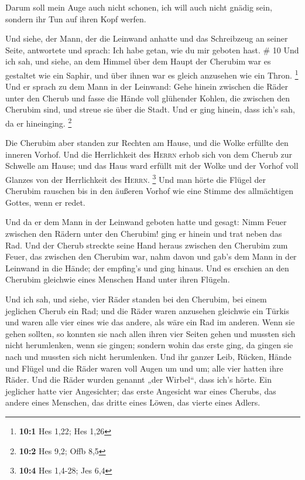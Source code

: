 Darum soll mein Auge auch nicht schonen, ich will auch
nicht gnädig sein, sondern ihr Tun auf ihren Kopf werfen.

 Und siehe, der Mann, der die Leinwand anhatte und das
Schreibzeug an seiner Seite, antwortete und sprach: Ich habe getan, wie
du mir geboten hast. \# 10  Und ich sah, und siehe, an dem
Himmel über dem Haupt der Cherubim war es gestaltet wie ein Saphir, und
über ihnen war es gleich anzusehen wie ein Thron. \footnote{\textbf{10:1}
  Hes 1,22; Hes 1,26}  Und er sprach zu dem Mann in der
Leinwand: Gehe hinein zwischen die Räder unter den Cherub und fasse die
Hände voll glühender Kohlen, die zwischen den Cherubim sind, und streue
sie über die Stadt. Und er ging hinein, dass ich's sah, da er
hineinging. \footnote{\textbf{10:2} Hes 9,2; Offb 8,5}

 Die Cherubim aber standen zur Rechten am Hause, und die
Wolke erfüllte den inneren Vorhof.  Und die Herrlichkeit
des \textsc{Herrn} erhob sich von dem Cherub zur Schwelle am Hause; und
das Haus ward erfüllt mit der Wolke und der Vorhof voll Glanzes von der
Herrlichkeit des \textsc{Herrn}. \footnote{\textbf{10:4} Hes 1,4-28; Jes
  6,4}  Und man hörte die Flügel der Cherubim rauschen bis
in den äußeren Vorhof wie eine Stimme des allmächtigen Gottes, wenn er
redet.

 Und da er dem Mann in der Leinwand geboten hatte und
gesagt: Nimm Feuer zwischen den Rädern unter den Cherubim! ging er
hinein und trat neben das Rad.  Und der Cherub streckte
seine Hand heraus zwischen den Cherubim zum Feuer, das zwischen den
Cherubim war, nahm davon und gab's dem Mann in der Leinwand in die
Hände; der empfing's und ging hinaus.  Und es erschien an
den Cherubim gleichwie eines Menschen Hand unter ihren Flügeln.

 Und ich sah, und siehe, vier Räder standen bei den
Cherubim, bei einem jeglichen Cherub ein Rad; und die Räder waren
anzusehen gleichwie ein Türkis  und waren alle vier eines
wie das andere, als wäre ein Rad im anderen.  Wenn sie
gehen sollten, so konnten sie nach allen ihren vier Seiten gehen und
mussten sich nicht herumlenken, wenn sie gingen; sondern wohin das erste
ging, da gingen sie nach und mussten sich nicht herumlenken.
 Und ihr ganzer Leib, Rücken, Hände und Flügel und die
Räder waren voll Augen um und um; alle vier hatten ihre Räder.
 Und die Räder wurden genannt „der Wirbel``, dass ich's
hörte.  Ein jeglicher hatte vier Angesichter; das erste
Angesicht war eines Cherubs, das andere eines Menschen, das dritte eines
Löwen, das vierte eines Adlers.


